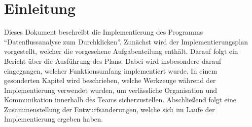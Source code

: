 \part{Einleitung}

Dieses Dokument beschreibt die Implementierung des Programms \enquote{Datenflussanalyse zum Durchklicken}. Zunächst wird der Implementierungsplan vorgestellt, welcher die vorgesehene Aufgabenteilung enthält.
Darauf folgt ein Bericht über die Ausführung des Plans. Dabei wird insbesondere darauf eingegangen, welcher Funktionsumfang implementiert wurde.
In einem gesonderten Kapitel wird beschrieben, welche Werkzeuge während der Implementierung verwendet wurden, um verlässliche Organisation und Kommunikation innerhalb des Teams sicherzustellen.
Abschließend folgt eine Zusammenstellung der Entwurfsänderungen, welche sich im Laufe der Implementierung ergeben haben. 